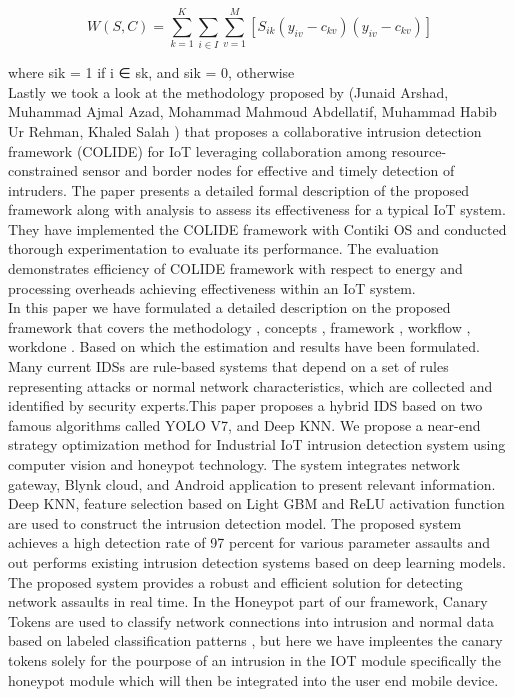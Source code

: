 \documentclass[letterpaper, 10 pt, conference]{ieeeconf}  %
\begin{document}
\begin{equation}
W(S,C) = \sum_{k=1}^{K}  \sum_{i \in I}  \sum_{v=1}^{M} [S_{ik}(y_{iv} - c_{kv})(y_{iv} - c_{kv})]
\end{equation}

where sik = 1 if i ∈ sk, and sik = 0, otherwise \\

Lastly we took a look at the methodology proposed by (Junaid Arshad, Muhammad Ajmal Azad, Mohammad Mahmoud Abdellatif, Muhammad Habib Ur Rehman, Khaled Salah
) that proposes a collaborative intrusion detection framework (COLIDE) for IoT leveraging collaboration among resource-constrained sensor and border nodes for effective and timely detection of intruders. The paper presents a detailed formal description of the proposed framework along with analysis to assess its effectiveness for a typical IoT system. They have  implemented the COLIDE framework with Contiki OS and conducted thorough experimentation to evaluate its performance. The evaluation demonstrates efficiency of COLIDE framework with respect to energy and processing overheads achieving effectiveness within an IoT system. \\

In this paper we have formulated a detailed description on the proposed framework that covers the methodology , concepts , framework , workflow , workdone . Based on which the estimation and results have been formulated. Many current IDSs are rule-based systems that depend on a set of rules representing attacks or normal network characteristics, which are collected and identified by security experts.This paper proposes a hybrid IDS based on two famous algorithms called YOLO V7, and Deep KNN. We  propose a near-end strategy optimization method for Industrial IoT intrusion detection system using computer vision and honeypot technology. The system integrates network gateway, Blynk cloud, and Android application to present
relevant information. Deep KNN, feature selection based on Light GBM and ReLU activation function are used to construct the intrusion detection model. The proposed system achieves a high detection rate of 97 percent for various parameter assaults and out performs existing intrusion detection systems based on deep learning models. The proposed 
system provides a robust and efficient solution for detecting network assaults in real time. In the Honeypot part of our framework, Canary Tokens are used to classify network connections into intrusion and normal data based on labeled  classification patterns , but here we have impleentes the canary tokens solely for the pourpose of an intrusion in the IOT module specifically the honeypot module which will then be integrated into the user end mobile device. \\
\end{document}
